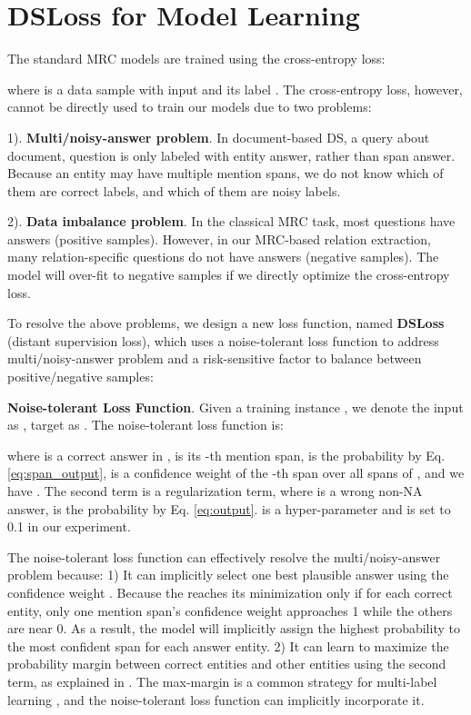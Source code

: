 \documentclass[11pt,a4paper]{article}
\begin{document}
  \section{DSLoss for Model Learning}
  The standard MRC models are trained using the cross-entropy loss:
  
  \noindent where  is a data sample with input  and its label .
  The cross-entropy loss, however, cannot be directly used to train our models due to two problems:
  
  1). \textbf{Multi/noisy-answer problem}. In document-based DS, a query about document, question is only labeled with entity answer, rather than span answer. Because an entity may have multiple mention spans, we do not know which of them are correct labels, and which of them are noisy labels. 
  
  2). \textbf{Data imbalance problem}. In the classical MRC task, most questions have answers (positive samples). However,  in our MRC-based relation extraction, many relation-specific questions do not have answers (negative samples). The model will over-fit to negative samples if we directly optimize the cross-entropy loss.
  
  To resolve the above problems, we design a new loss function, named \textbf{DSLoss} (distant supervision loss), which uses a noise-tolerant loss function  to address multi/noisy-answer problem and a risk-sensitive factor  to balance between positive/negative samples:
  
  
  \textbf{Noise-tolerant Loss Function}.
  Given a training instance , we denote the input as , target as . The noise-tolerant loss function is:
  
  
  \noindent where  is a correct answer in ,  is its -th mention span,  is the probability by Eq. \ref{eq:span_output},  is a confidence weight of the -th span over all spans of , and we have .
  The second term is a regularization term, where  is a wrong non-NA answer,  is the probability by Eq. \ref{eq:output}.  is a hyper-parameter and is set to 0.1 in our experiment.
  
  The noise-tolerant loss function can effectively resolve the multi/noisy-answer problem because:
  1) It can implicitly select one best plausible answer using the confidence weight .
  Because the  reaches its minimization only if for each correct entity, only one mention span's confidence weight approaches 1 while the others are near 0.
  As a result, the model will implicitly assign the highest probability to the most confident span for each answer entity.
  2) It can learn to maximize the probability margin between correct entities and other entities using the second term, as explained in \citet{lin_cost_2019}.
  The max-margin is a common strategy for multi-label learning \cite{taskar_max_2004, ye_deep_2019}, and the noise-tolerant loss function can implicitly incorporate it.
  
\end{document}
